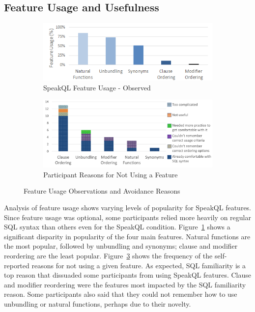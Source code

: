 \subsection{Feature Usage and Usefulness}
\begin{figure}
\begin{subfigure}{\linewidth}
  \centering
  \includegraphics[width=0.8\linewidth]{figures/feature_usage.png}
  \caption{SpeakQL Feature Usage - Observed}
  \label{fig:featureusage}
\end{subfigure}
\begin{subfigure}{\linewidth}
  \centering
  \includegraphics[width=0.8\linewidth]{figures/feature_unused_reasons_excel.png}
  \caption{Participant Reasons for Not Using a Feature}
  \label{fig:unusedfeatures}
\end{subfigure}
\caption{Feature Usage Observations and Avoidance Reasons}
\end{figure}
Analysis of feature usage shows varying levels of popularity for SpeakQL features. 
Since feature usage was optional, some participants relied more heavily on regular SQL syntax than others even for the SpeakQL condition. 
Figure~\ref{fig:featureusage} shows a significant disparity in popularity of the four main features. 
Natural functions are the most popular, followed by unbundling and synonyms; clause and modifier reordering are the least popular. 
Figure~\ref{fig:unusedfeatures} shows the frequency of the self-reported reasons for not using a given feature.
As expected, SQL familiarity is a top reason that dissuaded some participants from using SpeakQL features. 
Clause and modifier reordering were the features most impacted by the SQL familiarity reason. 
Some participants also said that they could not remember how to use unbundling or natural functions, perhaps due to their novelty.

